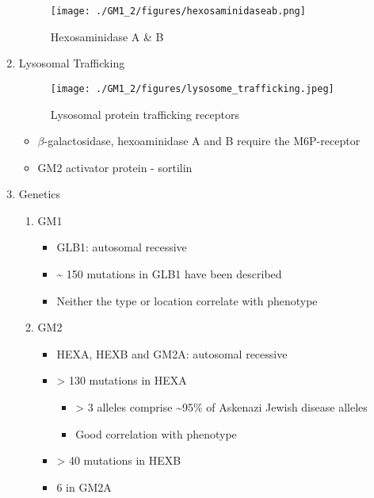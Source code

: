 \documentclass{scrartcl}
\begin{document}
\begin{enumerate}
\begin{figure}[htbp]
\centering
\texttt{[image: ./GM1\_2/figures/hexosaminidaseab.png]}
\caption{\label{fig:org437dce2}
Hexosaminidase A \& B}
\end{figure}


\item Lysosomal Trafficking
\label{sec:org151e626}

\begin{figure}[htbp]
\centering
\texttt{[image: ./GM1\_2/figures/lysosome\_trafficking.jpeg]}
\caption{\label{fig:org7171e87}
Lysosomal protein trafficking receptors}
\end{figure}

\footnotesize
\begin{itemize}
\item \(\beta\)-galactosidase, hexoaminidase A and B require the M6P-receptor
\item GM2 activator protein - sortilin
\end{itemize}

\item Genetics
\label{sec:org51abd73}
\begin{enumerate}
\item GM1
\label{sec:orgba235a5}
\begin{itemize}
\item GLB1: autosomal recessive
\item \textasciitilde{} 150 mutations in GLB1 have been described
\item Neither the type or location correlate with phenotype
\end{itemize}

\item GM2
\label{sec:org6146f94}
\begin{itemize}
\item HEXA, HEXB and GM2A: autosomal recessive
\item > 130 mutations in HEXA
\begin{itemize}
\item > 3 alleles comprise \textasciitilde{}95\% of Askenazi Jewish disease alleles
\item Good correlation with phenotype
\end{itemize}
\item > 40 mutations in HEXB
\item 6 in GM2A
\end{itemize}
\end{enumerate}
\end{enumerate}
\end{document}
